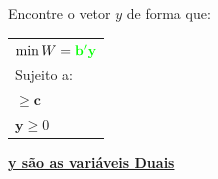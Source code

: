 \documentclass{beamer}
\begin{document}
\begin{frame}
\begin{columns}
\begin{column}{4cm}
\begin{mdframed}[backgroundcolor=red!50]
				Encontre o vetor \textbf{$y$} de forma que:
				\begin{table}
					\begin{tabular}{l}
						$ \min W = {\color{green} \mathbf{b'y}} $ \\
						Sujeito a: \\
						$\ge \mathbf{c}$ \\
						$ \mathbf{y} \ge 0$ \\
					\end{tabular}
				\end{table}
			\end{mdframed}
			\underline{\textbf{y são as variáveis Duais}}
		\end{column}
	\end{columns}
\end{frame}
\end{document}
